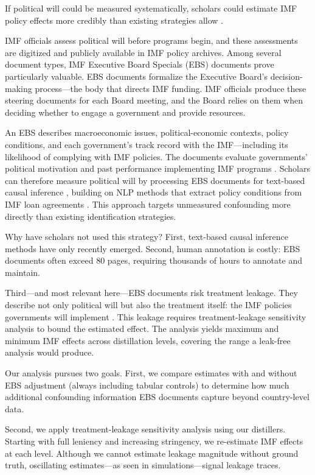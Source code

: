 \documentclass[11pt]{article}
\begin{document}
If political will could be measured systematically, scholars could estimate IMF policy effects more credibly than existing strategies allow \citep{dreher2009}.

IMF officials assess political will before programs begin, and these assessments are digitized and publicly available in IMF policy archives. Among several document types, IMF Executive Board Specials (EBS) documents prove particularly valuable. EBS documents formalize the Executive Board's decision-making process---the body that directs IMF funding. IMF officials produce these steering documents for each Board meeting, and the Board relies on them when deciding whether to engage a government and provide resources.

An EBS describes macroeconomic issues, political-economic contexts, policy conditions, and each government's track record with the IMF---including its likelihood of complying with IMF policies. The documents evaluate governments' political motivation and past performance implementing IMF programs \citep{vreeland2003}. Scholars can therefore measure political will by processing EBS documents for text-based causal inference \citep{roberts2020,mozer2020}, building on NLP methods that extract policy conditions from IMF loan agreements \citep{daoudNLPpolicy2019}. This approach targets unmeasured confounding more directly than existing identification strategies.

Why have scholars not used this strategy? First, text-based causal inference methods have only recently emerged. Second, human annotation is costly: EBS documents often exceed 80 pages, requiring thousands of hours to annotate and maintain.

Third---and most relevant here---EBS documents risk treatment leakage. They describe not only political will but also the treatment itself: the IMF policies governments will implement \citep{daoud2019international}. This leakage requires treatment-leakage sensitivity analysis to bound the estimated effect. The analysis yields maximum and minimum IMF effects across distillation levels, covering the range a leak-free analysis would produce.

Our analysis pursues two goals. First, we compare estimates with and without EBS adjustment (always including tabular controls) to determine how much additional confounding information EBS documents capture beyond country-level data.

Second, we apply treatment-leakage sensitivity analysis using our distillers. Starting with full leniency and increasing stringency, we re-estimate IMF effects at each level. Although we cannot estimate leakage magnitude without ground truth, oscillating estimates---as seen in simulations---signal leakage traces.
\end{document}
